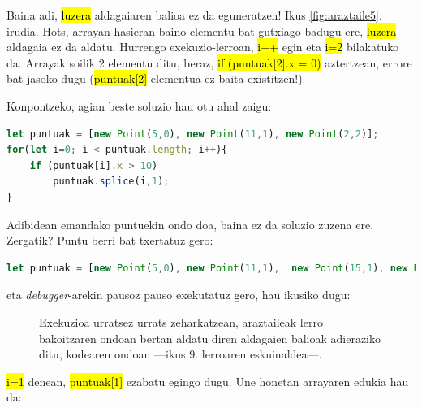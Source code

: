 Baina adi, \hl{luzera} aldagaiaren balioa ez da eguneratzen! Ikus \ref{fig:araztaile5}. irudia. Hots, arrayan hasieran baino elementu bat gutxiago badugu ere, \hl{luzera} aldagaia ez da aldatu. Hurrengo exekuzio-lerroan, \hl{i++} egin eta \hl{i=2} bilakatuko da. Arrayak soilik 2 elementu ditu, beraz, \hl{if (puntuak[2].x = 0)} aztertzean, errore bat jasoko dugu (\hl{puntuak[2]} elementua ez baita existitzen!).

Konpontzeko, agian beste soluzio hau otu ahal zaigu:

\begin{lstlisting}[language=JavaScript]
let puntuak = [new Point(5,0), new Point(11,1), new Point(2,2)];
for(let i=0; i < puntuak.length; i++){
    if (puntuak[i].x > 10)
        puntuak.splice(i,1);
}
\end{lstlisting}

Adibidean emandako puntuekin ondo doa, baina ez da soluzio zuzena ere. Zergatik? Puntu berri bat txertatuz gero:

\begin{lstlisting}[language=JavaScript,numbers=none]
let puntuak = [new Point(5,0), new Point(11,1),  new Point(15,1), new Point(2,2)];
\end{lstlisting}

eta \textit{debugger}-arekin pausoz pauso exekutatuz gero, hau ikusiko dugu:

\begin{figure}[ht]
	\centering
{}
\caption{Exekuzioa urratsez urrats zeharkatzean, araztaileak lerro bakoitzaren ondoan bertan aldatu diren aldagaien balioak adieraziko ditu, kodearen ondoan —ikus 9. lerroaren eskuinaldea—.}
\label{fig:araztaile6} 
\end{figure}

 \hl{i=1} denean, \hl{puntuak[1]} ezabatu egingo dugu. Une honetan arrayaren edukia hau da:
 
